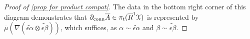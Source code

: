\documentclass[11pt]{amsart} \renewcommand{\baselinestretch}{1.4}
\theoremstyle{plain}
\theoremstyle{definition}
\renewcommand{\to}{\longrightarrow}
\newcommand{\frakt}{\mathfrak{t}}
\newcommand{\fraks}{\mathfrak{s}}
\newcommand{\calx}{\mathcal{X}}
\newcommand{\Dendo}{R}
\begin{document}
\begin{Operations on the Bousfield-Kan spectral sequence}
\begin{proof}[Proof of \ref{prop for product compat}]
The data in the bottom right corner of this diagram demonstrates that $\partial_\textup{conn}\overline{A}\in\pi_\frakt(\overline{\Dendo}^1\calx )$ is represented by ${\overline{\mu}(\nabla(\widetilde{\epsilon\alpha} \otimes\widetilde{\epsilon\beta}))}$,
which suffices, as $\alpha\sim \widetilde{\epsilon\alpha}$ and $\beta\sim \widetilde{\epsilon\beta}$.
\end{proof}




\end{Operations on the Bousfield-Kan spectral sequence}
\end{document}
